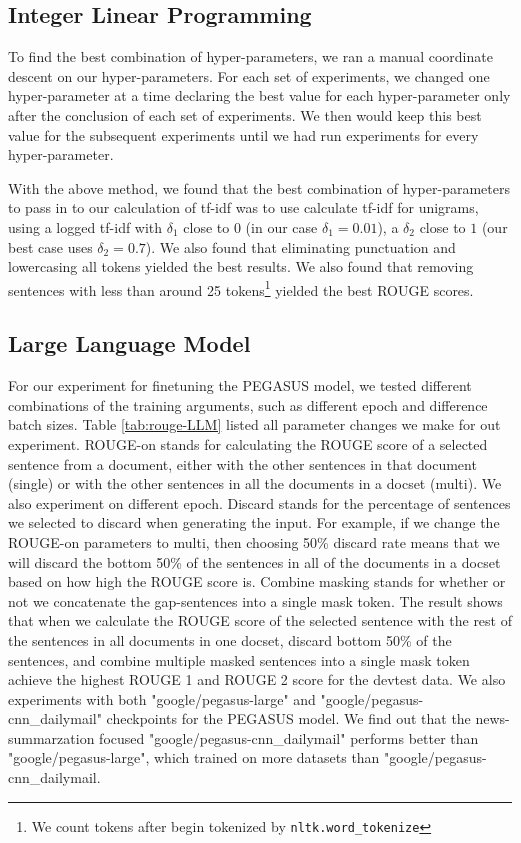 \subsection{Integer Linear Programming}
To find the best combination of hyper-parameters, we ran a manual coordinate descent on our hyper-parameters. For each set of experiments, we changed one hyper-parameter at a time declaring the best value for each hyper-parameter only after the conclusion of each set of experiments. We then would keep this best value for the subsequent experiments until we had run experiments for every hyper-parameter.

With the above method, we found that the best combination of hyper-parameters to pass in to our calculation of tf-idf was to use calculate tf-idf for unigrams, using a logged tf-idf with $\delta_{1}$ close to 0 (in our case $\delta_{1} = 0.01$), a $\delta_{2}$ close to $1$ (our best case uses $\delta_{2} = 0.7$). We also found that eliminating punctuation and lowercasing all tokens yielded the best results. We also found that removing sentences with less than around 25 tokens\footnote{We count tokens after begin tokenized by \texttt{nltk.word\_tokenize}} yielded the best ROUGE scores. 

\subsection{Large Language Model}

For our experiment for finetuning the PEGASUS model, we tested different combinations of the training arguments, such as different epoch and difference batch sizes. Table \ref{tab:rouge-LLM} listed all parameter changes we make for out experiment. ROUGE-on stands for calculating the ROUGE score of a selected sentence from a document, either with the other sentences in that document (single) or with the other sentences in all the documents in a docset (multi). We also experiment on different epoch. Discard stands for the percentage of sentences we selected to discard when generating the input. For example, if we change the ROUGE-on parameters to multi, then choosing 50\% discard rate means that we will discard the bottom 50\% of the sentences in all of the documents in a docset based on how high the ROUGE score is.
Combine masking stands for whether or not we concatenate the gap-sentences into a single mask token. The result shows that when we calculate the ROUGE score of the selected sentence with the rest of the sentences in all documents in one docset, discard bottom 50\% of the sentences, and combine multiple masked sentences into a single mask token achieve the highest ROUGE 1 and ROUGE 2 score for the devtest data. We also experiments with both "google/pegasus-large" and "google/pegasus-cnn\_dailymail" checkpoints for the PEGASUS model. We find out that the news-summarzation focused "google/pegasus-cnn\_dailymail" performs better than "google/pegasus-large", which trained on more datasets than "google/pegasus-cnn\_dailymail.

